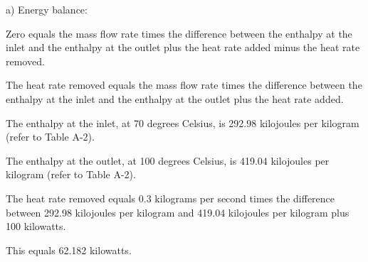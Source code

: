 a) Energy balance:

Zero equals the mass flow rate times the difference between the enthalpy at the inlet and the enthalpy at the outlet plus the heat rate added minus the heat rate removed.

The heat rate removed equals the mass flow rate times the difference between the enthalpy at the inlet and the enthalpy at the outlet plus the heat rate added.

The enthalpy at the inlet, at 70 degrees Celsius, is 292.98 kilojoules per kilogram (refer to Table A-2).

The enthalpy at the outlet, at 100 degrees Celsius, is 419.04 kilojoules per kilogram (refer to Table A-2).

The heat rate removed equals 0.3 kilograms per second times the difference between 292.98 kilojoules per kilogram and 419.04 kilojoules per kilogram plus 100 kilowatts.

This equals 62.182 kilowatts.